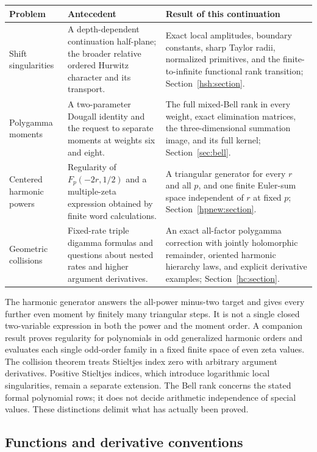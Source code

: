 \documentclass[11pt,a4paper]{article}
\numberwithin{equation}{section}
\theoremstyle{definition}
\theoremstyle{remark}
\begin{document}
\begin{longtable}{@{}p{}p{}p{}@{}}
\toprule
Problem & Antecedent & Result of this continuation\\
\midrule
\endhead
Shift singularities & A depth-dependent continuation half-plane;
the broader relative ordered Hurwitz character and its transport.
& Exact local amplitudes, boundary constants, sharp Taylor radii,
normalized primitives, and the finite-to-infinite functional rank
transition; Section~\ref{hsh:section}.\\[6pt]
Polygamma moments & A two-parameter Dougall identity and the request
to separate moments at weights six and eight.
& The full mixed-Bell rank in every weight, exact elimination
matrices, the three-dimensional summation image, and its full kernel;
Section~\ref{sec:bell}.\\[6pt]
Centered harmonic powers & Regularity of $F_p(-2r,1/2)$ and a
multiple-zeta expression obtained by finite word calculations.
& A triangular generator for every $r$ and all $p$, and one finite
Euler-sum space independent of $r$ at fixed $p$;
Section~\ref{hpnew:section}.\\[6pt]
Geometric collisions & Fixed-rate triple digamma formulas and
questions about nested rates and higher argument derivatives.
& An exact all-factor polygamma correction with jointly holomorphic
remainder, oriented harmonic hierarchy laws, and explicit derivative
examples; Section~\ref{hc:section}.\\
\bottomrule
\end{longtable}

The harmonic generator answers the all-power minus-two target and
gives every further even moment by finitely many triangular steps.
It is not a single closed two-variable expression in both the power
and the moment order. A companion result proves regularity for
polynomials in odd generalized harmonic orders and evaluates each
single odd-order family in a fixed finite space of even zeta values.
The collision theorem treats Stieltjes index
zero with arbitrary argument derivatives. Positive Stieltjes indices,
which introduce logarithmic local singularities, remain a separate
extension. The Bell rank concerns the stated formal polynomial rows;
it does not decide arithmetic independence of special values.
These distinctions delimit what has actually been proved.

\subsection{Functions and derivative conventions}
\end{document}
